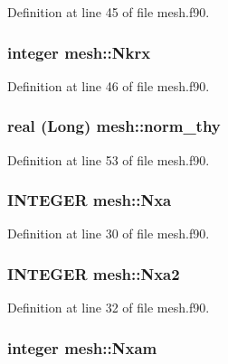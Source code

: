 Definition at line 45 of file mesh.f90.

\hypertarget{namespacemesh_a1750b1e7febac49c12606a9cbf2c4ac2}{
\subsubsection[{Nkrx}]{\setlength{\rightskip}{0pt plus 5cm}integer {\bf mesh::Nkrx}}}
\label{namespacemesh_a1750b1e7febac49c12606a9cbf2c4ac2}


Definition at line 46 of file mesh.f90.

\hypertarget{namespacemesh_a753aba092294fa8bffbee1fc1b099584}{
\subsubsection[{norm\_\-thy}]{\setlength{\rightskip}{0pt plus 5cm}real (Long) {\bf mesh::norm\_\-thy}}}
\label{namespacemesh_a753aba092294fa8bffbee1fc1b099584}


Definition at line 53 of file mesh.f90.

\hypertarget{namespacemesh_ae1fae2c81e5dc8a2e00f92d4ccb24444}{
\subsubsection[{Nxa}]{\setlength{\rightskip}{0pt plus 5cm}INTEGER {\bf mesh::Nxa}}}
\label{namespacemesh_ae1fae2c81e5dc8a2e00f92d4ccb24444}


Definition at line 30 of file mesh.f90.

\hypertarget{namespacemesh_a632597390bacfaae4c10d8cb907b2aec}{
\subsubsection[{Nxa2}]{\setlength{\rightskip}{0pt plus 5cm}INTEGER {\bf mesh::Nxa2}}}
\label{namespacemesh_a632597390bacfaae4c10d8cb907b2aec}


Definition at line 32 of file mesh.f90.

\hypertarget{namespacemesh_abe9e186636ba22271b7b4550522dceaf}{
\subsubsection[{Nxam}]{\setlength{\rightskip}{0pt plus 5cm}integer {\bf mesh::Nxam}}}
\label{namespacemesh_abe9e186636ba22271b7b4550522dceaf}


